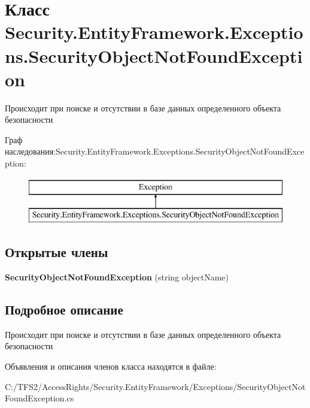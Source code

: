 \hypertarget{class_security_1_1_entity_framework_1_1_exceptions_1_1_security_object_not_found_exception}{}\section{Класс Security.\+Entity\+Framework.\+Exceptions.\+Security\+Object\+Not\+Found\+Exception}
\label{class_security_1_1_entity_framework_1_1_exceptions_1_1_security_object_not_found_exception}


Происходит при поиске и отсутствии в базе данных определенного объекта безопасности  


Граф наследования\+:Security.\+Entity\+Framework.\+Exceptions.\+Security\+Object\+Not\+Found\+Exception\+:\begin{figure}[H]
\begin{center}
\leavevmode
\includegraphics[height=2.000000cm]{d2/dfa/class_security_1_1_entity_framework_1_1_exceptions_1_1_security_object_not_found_exception}
\end{center}
\end{figure}
\subsection*{Открытые члены}
\begin{DoxyCompactItemize}
\item 
\mbox{\label{class_security_1_1_entity_framework_1_1_exceptions_1_1_security_object_not_found_exception_ab5159f5f675cec1f5798466cd58da91b}} 
{\bfseries Security\+Object\+Not\+Found\+Exception} (string object\+Name)
\end{DoxyCompactItemize}


\subsection{Подробное описание}
Происходит при поиске и отсутствии в базе данных определенного объекта безопасности 



Объявления и описания членов класса находятся в файле\+:\begin{DoxyCompactItemize}
\item 
C\+:/\+T\+F\+S2/\+Access\+Rights/\+Security.\+Entity\+Framework/\+Exceptions/Security\+Object\+Not\+Found\+Exception.\+cs\end{DoxyCompactItemize}
